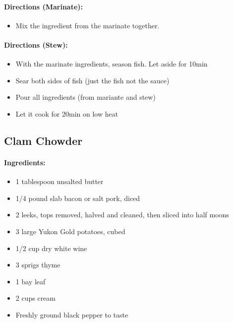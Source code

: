 \documentclass{article}
\begin{document}
\paragraph{Directions (Marinate):}
\begin{itemize}
    \item Mix the ingredient from the marinate together.
\end{itemize}  

\paragraph{Directions (Stew):}
\begin{itemize}
    \item With the marinate ingredients, season fish. Let aside for 10min
    \item Sear both sides of fish (just the fish not the sauce)
    \item Pour all ingredients (from mariante and stew)
    \item Let it cook for 20min on low heat
\end{itemize} 

\subsection{Clam Chowder}

\paragraph{Ingredients:}
\begin{itemize}
    \item 1 tablespoon unsalted butter
    \item 1/4 pound slab bacon or salt pork, diced
    \item 2 leeks, tops removed, halved and cleaned, then sliced into half moons
    \item 3 large Yukon Gold potatoes, cubed
    \item 1/2 cup dry white wine
    \item 3 sprigs thyme
    \item 1 bay leaf
    \item 2 cups cream
    \item Freshly ground black pepper to taste
\end{itemize}
\end{document}
